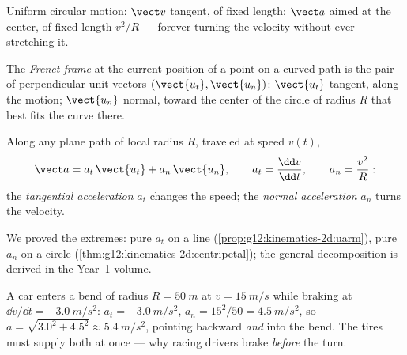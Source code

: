 \begin{omfigure}

{\small Uniform circular motion: $\vect v$ tangent, of fixed length;
$\vect a$ aimed at the center, of fixed length $v^2/R$ --- forever
turning the velocity without ever stretching it.}
\end{omfigure}

\begin{definition}\label{def:g12:kinematics-2d:frenet}
The \emph{Frenet frame} at the current position
of a point on a curved path is the pair of perpendicular unit
vectors $(\vect{u_t}, \vect{u_n})$: $\vect{u_t}$ tangent, along the
motion; $\vect{u_n}$ normal, toward the center of the circle of
radius $R$ that best fits the curve there.
\end{definition}

\begin{proposition}\label{prop:g12:kinematics-2d:frenetacc}
Along any plane path of local radius $R$, traveled at speed $v(t)$,
\[
\vect a = a_t\,\vect{u_t} + a_n\,\vect{u_n},
\qquad a_t = \frac{\dd v}{\dd t},
\qquad a_n = \frac{v^2}{R}:
\]
the \emph{tangential acceleration}
$a_t$ changes the speed; the \emph{normal
acceleration} $a_n$ turns the velocity.
\end{proposition}
\admitted

\begin{remark}\label{rem:g12:kinematics-2d:frenetproof}
We proved the extremes: pure $a_t$ on a line
(\cref{prop:g12:kinematics-2d:uarm}), pure $a_n$ on a circle
(\cref{thm:g12:kinematics-2d:centripetal}); the general
decomposition is derived in the Year~1 volume.
\end{remark}

\begin{example}\label{ex:g12:kinematics-2d:bend}
A car enters a bend of radius $R = \qty{50}{m}$ at $v = \qty{15}{m/s}$
while braking at $\dd v/\dd t = \qty{-3.0}{m/s^2}$: $a_t =
\qty{-3.0}{m/s^2}$, $a_n = 15^2/50 = \qty{4.5}{m/s^2}$, so $a =
\sqrt{3.0^2 + 4.5^2} \approx \qty{5.4}{m/s^2}$, pointing backward
\emph{and} into the bend. The tires must supply both at once ---
why racing drivers brake \emph{before} the turn.
\end{example}

